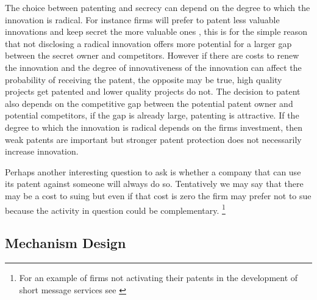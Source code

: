 \documentclass[12pt]{article}
\numberwithin{equation}{section}
\begin{document}

The choice between patenting and secrecy can depend on the degree to which the innovation is radical. For instance firms will prefer to patent less valuable innovations and keep secret the more valuable ones \cite{Anton2004} , this is for the simple reason that not disclosing a radical innovation offers more potential for a larger gap between the secret owner and competitors. However if there are costs to renew the innovation and the degree of innovativeness of the innovation can affect the probability of receiving the patent, the opposite may be true, high quality projects get patented and lower quality projects do not\cite{Mose2011}. The decision to patent also depends on the competitive gap between the potential patent owner and potential competitors, if the gap is already large, patenting is attractive. If the degree to which the innovation is radical depends on the firms investment, then weak patents are important but stronger patent protection does not necessarily increase innovation\cite{Kultti2006}. %

Perhaps another interesting question to ask is whether a company that can use its patent against someone will always do so. Tentatively we may say that there may be a cost to suing but even if that cost is zero the firm may prefer not to sue because the activity in question could be complementary. \footnote{For an example of firms not activating their patents in the development of short message services see \cite{corrocher2013development}}

\subsection{Mechanism Design}
\end{document}
